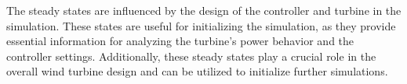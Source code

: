 
The steady states are influenced by the design of the controller and turbine in the simulation. These states are useful for initializing the simulation, as they provide essential information for analyzing the turbine's power behavior and the controller settings. Additionally, these steady states play a crucial role in the overall wind turbine design and can be utilized to initialize further simulations.
\\[16pt]

